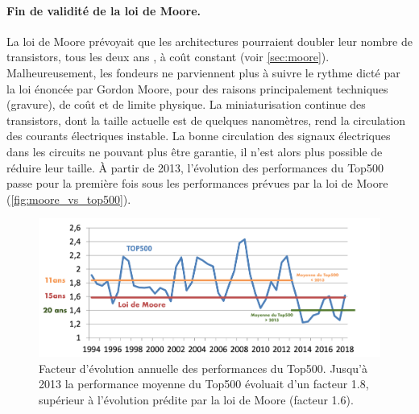      
        \paragraph{Fin de validité de la loi de Moore.}\label{sec:end_mooore} 
            
            La loi de Moore \cite{Moore1998} prévoyait que les architectures pourraient doubler leur nombre de transistors, tous les deux ans \cite{Moore75}, à coût constant (voir \autoref{sec:moore}). Malheureusement, les fondeurs ne parviennent plus à suivre le rythme dicté par la loi énoncée par Gordon Moore, pour des raisons principalement techniques (gravure), de coût \cite{Brooks2017} et de limite physique. La miniaturisation continue des transistors, dont la taille actuelle est de quelques nanomètres, rend la circulation des courants électriques instable. La bonne circulation des signaux électriques dans les circuits ne pouvant plus être garantie, il n'est alors plus possible de réduire leur taille.
            À partir de 2013, l'évolution des performances du Top500 passe pour la première fois sous les performances prévues par la loi de Moore (\autoref{fig:moore_vs_top500}).
            

            \begin{figure}
            \center
            \includegraphics[width=16cm]{images/moore_vs_top500.png}
            \caption{\label{fig:moore_vs_top500}
             Facteur d'évolution annuelle des performances du Top500\protect\footnotemark. Jusqu'à 2013 la performance moyenne du Top500 évoluait d'un facteur 1.8, supérieur à l'évolution prédite par la loi de Moore (facteur 1.6). }
                \end{figure}

